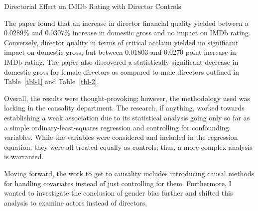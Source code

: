 \documentclass[
]{agujournal2019}
\begin{document}
\begin{table}

\caption{\label{tbl-2}Directorial Effect on IMDb Rating with Director
Controls}


\end{table}%

The paper found that an increase in director financial quality yielded
between a 0.0289\% and 0.0307\% increase in domestic gross and no impact
on IMDb rating. Conversely, director quality in terms of critical
acclaim yielded no significant impact on domestic gross, but between
0.01803 and 0.0270 point increase in IMDb rating. The paper also
discovered a statistically significant decrease in domestic gross for
female directors as compared to male directors outlined in
Table~\ref{tbl-1} and Table~\ref{tbl-2}.

Overall, the results were thought-provoking; however, the methodology
used was lacking in the causality department. The research, if anything,
worked towards establishing a weak association due to its statistical
analysis going only so far as a simple ordinary-least-squares regression
and controlling for confounding variables. While the variables were
considered and included in the regression equation, they were all
treated equally as controls; thus, a more complex analysis is warranted.

Moving forward, the work to get to causality includes introducing causal
methods for handling covariates instead of just controlling for them.
Furthermore, I wanted to investigate the conclusion of gender bias
further and shifted this analysis to examine actors instead of
directors.
\end{document}
